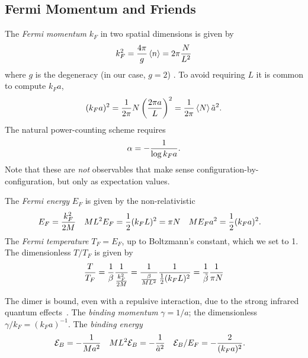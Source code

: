 \subsection{Fermi Momentum and Friends}\label{sec:kF}

The \emph{Fermi momentum} $k_F$ in two spatial dimensions is given by
\begin{align}
    k_F^2 = \frac{4\pi}{g} \left\langle n \right\rangle = 2\pi \frac{N}{L^2}
    \label{eq:kF}
\end{align}
where $g$ is the degeneracy (in our case, $g=2$) \cite{Beane:2022wcn}.
To avoid requiring $L$ it is common to compute $k_F a$,
\begin{align}
    (k_F a)^2 = \frac{1}{2\pi} N \left(\frac{2\pi a}{L}\right)^2 = \frac{1}{2\pi} \left\langle N \right\rangle \tilde{a}^2.
    \label{eq:kF a}
\end{align}
The natural power-counting scheme requires\cite{Beane:2022wcn}
\begin{align}
    \alpha = - \frac{1}{\log k_F a}.
    \label{eq:alpha}
\end{align}
Note that these are \emph{not} observables that make sense configuration-by-configuration, but only as expectation values.

The \emph{Fermi energy} $E_F$ is given by the non-relativistic
\begin{align}
    E_F &= \frac{k_F^2}{2M}
    &
    ML^2 E_F &= \frac{1}{2} (k_F L)^2 = \pi N
    &
    ME_F a^2 &= \frac{1}{2} (k_F a)^2.
\end{align}
The \emph{Fermi temperature} $T_F=E_F$, up to Boltzmann's constant, which we set to 1.
The dimensionless $T/T_F$ is given by
\begin{align}
    \frac{T}{T_F} = \frac{1}{\beta}\frac{1}{\frac{k_F^2}{2M}} = \frac{1}{\frac{\beta}{ML^2}} \frac{1}{\frac{1}{2} (k_F L)^2} = \frac{1}{\tilde{\beta}} \frac{1}{\pi N}
    \label{eq:TF}
\end{align}

The dimer is bound, even with a repulsive interaction, due to the strong infrared quantum effects~\cite{Beane:2022wcn}.
The \emph{binding momentum} $\gamma=1/a$; the dimensionless $\gamma/k_F = (k_F a)^{-1}$.
The \emph{binding energy} \binding
\begin{align}
    \mathcal{E}_B &= - \frac{1}{Ma^2}
    &
    ML^2 \mathcal{E}_B &= - \frac{1}{\tilde{a}^2}
    &
    \mathcal{E}_B / E_F &= - \frac{2}{(k_F a)^2}.
\end{align}
